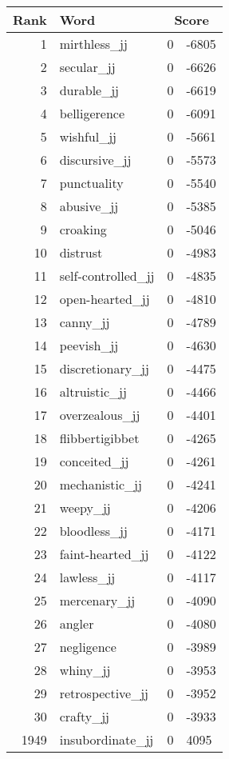 \begin{longtable}[!htbp]{| rlr@{.}l |}
    \hline
    \textbf{Rank} & \textbf{Word} & \multicolumn{2}{c|}{\textbf{Score}} \\
    \hline
    \endhead
    1 & mirthless\_jj & 0 & -6805 \\
    2 & secular\_jj & 0 & -6626 \\
    3 & durable\_jj & 0 & -6619 \\
    4 & belligerence & 0 & -6091 \\
    5 & wishful\_jj & 0 & -5661 \\
    6 & discursive\_jj & 0 & -5573 \\
    7 & punctuality & 0 & -5540 \\
    8 & abusive\_jj & 0 & -5385 \\
    9 & croaking & 0 & -5046 \\
    10 & distrust & 0 & -4983 \\
    11 & self-controlled\_jj & 0 & -4835 \\
    12 & open-hearted\_jj & 0 & -4810 \\
    13 & canny\_jj & 0 & -4789 \\
    14 & peevish\_jj & 0 & -4630 \\
    15 & discretionary\_jj & 0 & -4475 \\
    16 & altruistic\_jj & 0 & -4466 \\
    17 & overzealous\_jj & 0 & -4401 \\
    18 & flibbertigibbet & 0 & -4265 \\
    19 & conceited\_jj & 0 & -4261 \\
    20 & mechanistic\_jj & 0 & -4241 \\
    21 & weepy\_jj & 0 & -4206 \\
    22 & bloodless\_jj & 0 & -4171 \\
    23 & faint-hearted\_jj & 0 & -4122 \\
    24 & lawless\_jj & 0 & -4117 \\
    25 & mercenary\_jj & 0 & -4090 \\
    26 & angler & 0 & -4080 \\
    27 & negligence & 0 & -3989 \\
    28 & whiny\_jj & 0 & -3953 \\
    29 & retrospective\_jj & 0 & -3952 \\
    30 & crafty\_jj & 0 & -3933 \\
    1949 & insubordinate\_jj & 0 & 4095 \\

\end{longtable}
